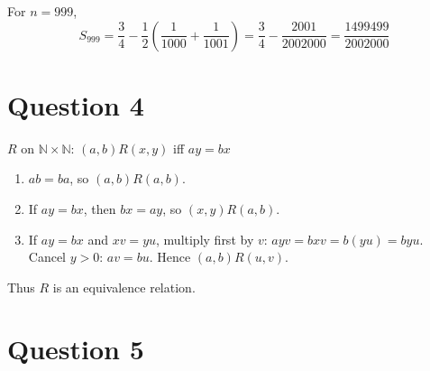 \documentclass[twoside]{article}
\begin{document}
For \(n=999\),
\[S_{999} = \frac{3}{4} - \frac{1}{2}\left(\frac{1}{1000} + \frac{1}{1001}\right) = \frac{3}{4} - \frac{2001}{2002000} = \frac{1499499}{2002000}\]

\section*{Question 4}
 
\(R\) on \(\mathbb{N}\times\mathbb{N}\): \((a,b)R(x,y)\) iff \(ay = bx\)
\begin{enumerate}
    \item {} \(ab = ba\), so \((a,b)R(a,b)\).
    \item {} If \(ay=bx\), then \(bx=ay\), so \((x,y)R(a,b)\).
    \item {} If \(ay=bx\) and \(xv=yu\), multiply first by \(v\): \(ayv=bxv=b(yu)=byu\). \\
            Cancel \(y>0\): \(av=bu\). Hence \((a,b)R(u,v)\). 
\end{enumerate}
Thus \(R\) is an equivalence relation.

\section*{Question 5}
\end{document}
